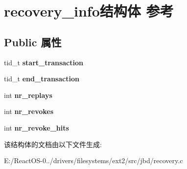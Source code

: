 \hypertarget{structrecovery__info}{}\section{recovery\+\_\+info结构体 参考}
\label{structrecovery__info}
\subsection*{Public 属性}
\begin{DoxyCompactItemize}
\item 
\mbox{\label{structrecovery__info_a46af6c1315ba5b4dfc7f10e842e19a94}} 
tid\+\_\+t {\bfseries start\+\_\+transaction}
\item 
\mbox{\label{structrecovery__info_ac52a266dd6d581319db5a4c5138a77ae}} 
tid\+\_\+t {\bfseries end\+\_\+transaction}
\item 
\mbox{\label{structrecovery__info_ae8c9e4c24f5b3a4a6805386cf7689dcd}} 
int {\bfseries nr\+\_\+replays}
\item 
\mbox{\label{structrecovery__info_a4cffa61a1641fb3d3e66cfc85046fe2a}} 
int {\bfseries nr\+\_\+revokes}
\item 
\mbox{\label{structrecovery__info_ab5207e39277e058fbc49cae2d547d785}} 
int {\bfseries nr\+\_\+revoke\+\_\+hits}
\end{DoxyCompactItemize}


该结构体的文档由以下文件生成\+:\begin{DoxyCompactItemize}
\item 
E\+:/\+React\+O\+S-\/0../drivers/filesystems/ext2/src/jbd/recovery.\+c\end{DoxyCompactItemize}
